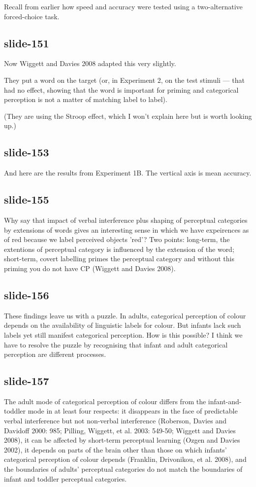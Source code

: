 \documentclass[12pt,\papersize]{extarticle}
\begin{document}
Recall from earlier how speed and accuracy were tested using a two-alternative forced-choice task.

\subsection{slide-151}
Now Wiggett and Davies 2008 adapted this very slightly.

They put a word on the target (or, in Experiment 2, on the test stimuli --- that had no effect, showing that the word is important for priming and categorical perception is not a matter of matching label to label).

(They are using the Stroop effect, which I won't explain here but is worth looking up.)

\subsection{slide-153}
And here are the results from Experiment 1B.  The vertical axis is mean accuracy.

\subsection{slide-155}
Why say that impact of verbal interference plus shaping of perceptual categories by extensions of words gives an interesting sense in which we have expeirences as of red because we label perceived objects 'red'?  Two points: long-term, the extentions of perceptual category is influenced by the extension of the word; short-term, covert labelling primes the perceptual category and without this priming you do not have CP (Wiggett and Davies 2008).

\subsection{slide-156}
These findings leave us with a puzzle.
In adults, categorical perception of colour depends on the availability of linguistic labels for colour.
But infants lack such labels yet still manifest categorical perception.
How is this possible?
I think we have to resolve the puzzle by recognising that infant and adult categorical perception are different processes.

\subsection{slide-157}
The adult mode of categorical perception of colour differs from the infant-and-toddler mode in at least four respects: it disappears in the face of
predictable verbal interference but not non-verbal interference (Roberson, Davies and Davidoff 2000: 985; Pilling, Wiggett, et al. 2003: 549-50; Wiggett and
Davies 2008), it can be affected by short-term perceptual learning (Ozgen and Davies 2002), it depends on parts of the brain other than those on which
infants' categorical perception of colour depends (Franklin, Drivonikou, et al. 2008), and the boundaries of adults' perceptual categories do not match the
boundaries of infant and toddler perceptual categories.
\end{document}
